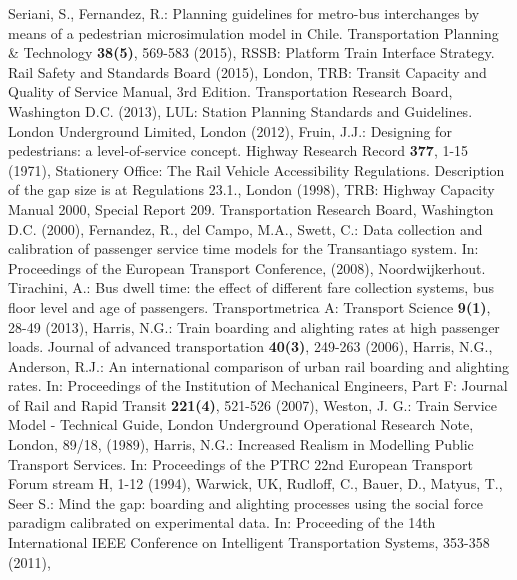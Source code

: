 \begin{thebibliography}{1}
    Seriani, S., Fernandez, R.: Planning guidelines for metro-bus interchanges by means of a pedestrian microsimulation model in Chile. Transportation Planning \& Technology  \textbf{38(5)}, 569-583 (2015),
    RSSB: Platform Train Interface Strategy. Rail Safety and Standards Board (2015), London,
    TRB: Transit Capacity and Quality of Service Manual, 3rd Edition. Transportation Research Board, Washington D.C. (2013),
    LUL: Station Planning Standards and Guidelines. London Underground Limited, London (2012),
    Fruin, J.J.: Designing for pedestrians: a level-of-service concept. Highway Research Record  \textbf{377}, 1-15 (1971),
    Stationery Office: The Rail Vehicle Accessibility Regulations. Description of the gap size is at Regulations 23.1., London (1998),
    TRB: Highway Capacity Manual 2000, Special Report 209. Transportation Research Board, Washington D.C. (2000),
    Fernandez, R., del Campo, M.A., Swett, C.: Data collection and calibration of passenger service time models for the Transantiago system. In: Proceedings of the European Transport Conference, (2008), Noordwijkerhout.
    Tirachini, A.: Bus dwell time: the effect of different fare collection systems, bus floor level and age of passengers. Transportmetrica A: Transport Science  \textbf{9(1)}, 28-49 (2013),
    Harris, N.G.: Train boarding and alighting rates at high passenger loads. Journal of advanced transportation \textbf{40(3)}, 249-263 (2006),
    Harris, N.G., Anderson, R.J.: An international comparison of urban rail boarding and alighting rates. In: Proceedings of the Institution of Mechanical Engineers, Part F: Journal of Rail and Rapid Transit \textbf{221(4)}, 521-526 (2007),
    Weston, J. G.: Train Service Model - Technical Guide, London Underground Operational Research Note, London, 89/18, (1989),
    Harris, N.G.: Increased Realism in Modelling Public Transport Services. In: Proceedings of the PTRC 22nd European Transport Forum stream H, 1-12 (1994), Warwick, UK,
    Rudloff, C., Bauer, D., Matyus, T., Seer S.: Mind the gap: boarding and alighting processes using the social force paradigm calibrated on experimental data. In: Proceeding of the 14th International IEEE Conference on Intelligent Transportation Systems, 353-358 (2011),

\end{thebibliography}
